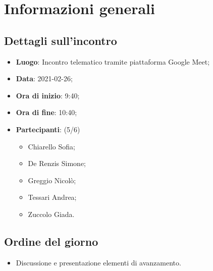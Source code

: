 \section{Informazioni generali}

\subsection{Dettagli sull'incontro}
\begin{itemize}
\item \textbf{Luogo}: Incontro telematico tramite piattaforma Google Meet;
\item \textbf{Data}: 2021-02-26;
\item \textbf{Ora di inizio}: 9:40;
\item \textbf{Ora di fine}: 10:40;
\item \textbf{Partecipanti}: (5/6)
\begin{itemize}
	\item Chiarello Sofia;
    \item De Renzis Simone;
    \item Greggio Nicolò;
    \item Tessari Andrea;
    \item Zuccolo Giada.
\end{itemize}
\end{itemize}

\subsection{Ordine del giorno}
\begin{itemize}
	\item Discussione e presentazione elementi di avanzamento.
\end{itemize}


